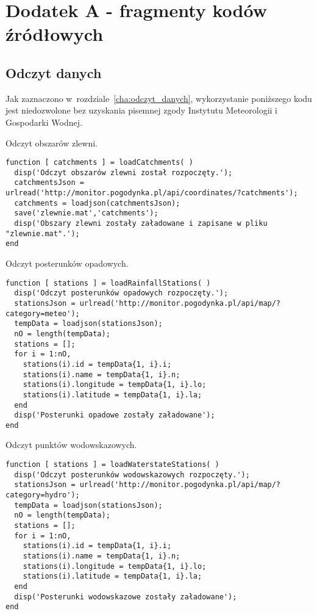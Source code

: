 \chapter{Dodatek A - fragmenty kodów źródłowych}
\label{cha:dodatek_A}
\section{Odczyt danych} %
\label{sec:kod_odczyt_danych}
Jak zaznaczono w~rozdziale~\ref{cha:odczyt_danych}, wykorzystanie poniższego kodu jest niedozwolone bez uzyskania pisemnej zgody Instytutu Meteorologii i Gospodarki Wodnej.

Odczyt obszarów zlewni.
\begin{lstlisting}
function [ catchments ] = loadCatchments( )
  disp('Odczyt obszarów zlewni został rozpoczęty.');
  catchmentsJson = urlread('http://monitor.pogodynka.pl/api/coordinates/?catchments');
  catchments = loadjson(catchmentsJson);
  save('zlewnie.mat','catchments');
  disp('Obszary zlewni zostały załadowane i zapisane w pliku "zlewnie.mat".');
end
\end{lstlisting}

Odczyt posterunków opadowych.
\begin{lstlisting}
function [ stations ] = loadRainfallStations( )
  disp('Odczyt posterunków opadowych rozpoczęty.');
  stationsJson = urlread('http://monitor.pogodynka.pl/api/map/?category=meteo');
  tempData = loadjson(stationsJson);
  nO = length(tempData);
  stations = [];
  for i = 1:nO,
    stations(i).id = tempData{1, i}.i;
    stations(i).name = tempData{1, i}.n;
    stations(i).longitude = tempData{1, i}.lo;
    stations(i).latitude = tempData{1, i}.la;
  end
  disp('Posterunki opadowe zostały załadowane');
end
\end{lstlisting}

Odczyt punktów wodowskazowych.
\begin{lstlisting}
function [ stations ] = loadWaterstateStations( )
  disp('Odczyt posterunków wodowskazowych rozpoczęty.');
  stationsJson = urlread('http://monitor.pogodynka.pl/api/map/?category=hydro');
  tempData = loadjson(stationsJson);
  nO = length(tempData);
  stations = [];
  for i = 1:nO,
    stations(i).id = tempData{1, i}.i;
    stations(i).name = tempData{1, i}.n;
    stations(i).longitude = tempData{1, i}.lo;
    stations(i).latitude = tempData{1, i}.la;
  end
  disp('Posterunki wodowskazowe zostały załadowane');
end
\end{lstlisting}

